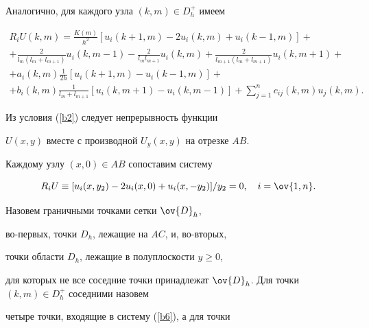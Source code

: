Аналогично, для каждого узла $(k,m)\in D_h^+$ имеем


\begin{multline}\label{b6}


R_iU(k,m) = \frac{K(m)}{h^2} [ u_i(k+1, m) - 2u_i(k, m) +


u_i(k-1, m) ]+\\


%


+ \frac{2}{l_m(l_m+l_{m+1})}u_i(k, {m-1})


-\frac{2}{l_m l_{m+1}}u_i(k, {m}) +


\frac{2}{l_{m+1}(l_m+l_{m+1})}u_i(k, {m+1})+\\


%


+ a_i(k,m)\frac{1}{2h} [ u_i(k+1,m) - u_i(k-1,m) ] + \\


%


+b_i(k,m)\frac{1}{l_m + l_{m+1}} [ u_i(k,m+1) -


u_i(k,m-1) ]+


\sum_{j=1}^{n} c_{ij}(k,m)u_j(k,m).


\end{multline}





Из условия (\ref{b2}) следует непрерывность функции


$U(x,y)$ вместе с производной $U_y(x,y)$ на отрезке $AB$.


Каждому узлу $(x,0)\in AB$ сопоставим систему


\begin{equation}\label{b7}


R_iU \equiv [u_i(x,y_2) - 2u_i(x,0) +


u_i(x,-y_2)]/y_2=0,\quad i=\ov{1,n}.


\end{equation}





Назовем граничными точками сетки $\ov {D}_h$,


во-первых, точки ${D}_h$, лежащие на $AC$, и, во-вторых,


точки области ${D_h}$, лежащие в полуплоскости $y \geq 0$,


для которых не все соседние точки принадлежат $\ov


{D}_h$. Для точки $(k,m) \in D_h^+$ соседними назовем


четыре точки, входящие в систему (\ref{b6}), а для точки


